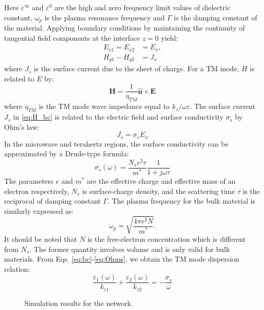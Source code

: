 \documentclass[conference, 10pt]{IEEEtran}
\renewcommand{\v}[1]{\mathbf{#1}} %
\renewcommand{\O}{\omega}  %
\newcommand{\E}{\varepsilon}  %
\renewcommand{\inf}{\infty}  %
\renewcommand{\^}{\hat}  %
\begin{document}
%
Here $\E^{\inf}$ and $\E^0$ are the high and zero frequency limit values of dielectric constant, $\O_p$ is the plasma resonance frequency and $\Gamma$ is the damping constant of the material. Applying boundary conditions by maintaining the continuity of tangential field components at the interface $z = 0$ yield:
%
\begin{subequations}
  \begin{align}
    E_{x1} =  E_{x2} &= E_x,
    \label{eq:E_bc}\\
    H_{y1} - H_{y2} &= J_s
    \label{eq:H_bc}
  \end{align}
  \label{eq:bc}
\end{subequations}
%
where $J_s$ is the surface current due to the sheet of charge. For a TM mode, $H$ is related to $E$ by:
%
\begin{equation}
  \v H = \frac{1}{\eta_{TM}} \v{\^{n}} \times \v E
  \label{eq:H_TM}
\end{equation}
%
where $\eta_{TM}$ is the TM mode wave impedance equal to $k_{z}/{\O \E}$. The surface current $J_s$ in \eqref{eq:H_bc} is related to the electric field and surface conductivity $\sigma_s$ by Ohm's law:
%
\begin{equation}
  J_s = \sigma_s E_x
  \label{eq:Ohms}
\end{equation}
%
In the microwave and terahertz regions, the surface conductivity can be approximated by a Drude-type formula:
%
\begin{equation}
  \sigma_s(\O) = \frac{N_s e^2 \tau}{m^{\ast}}\frac{1}{1 + j \O \tau}
  \label{eq:conductivity}
\end{equation}
%
The parameters $e$ and $m^*$ are the effective charge and effective mass of an electron respectively, $N_s$ is  surface-charge density, and the scattering time $\tau$ is the reciprocal of damping constant $\Gamma$. The plasma frequency for the bulk material is similarly expressed as:
%
\begin{equation}
  \O_{p} =  \sqrt{\frac{4 \pi e^2 N} {m^{\ast}}}.
  \label{eq:plasma_f}
\end{equation}
%
It should be noted that $N$ is the free-electron concentration which is different from $N_s$. The former quantity involves volume and is only valid for bulk materials. From Eqs. \eqref{eq:bc}-\eqref{eq:Ohms}, we obtain the TM mode dispersion relation:
%
\begin{equation}
  \frac{\E_1(\O)}{k_{z1}} + \frac{\E_2(\O)}{k_{z2}} = -\frac{\sigma_s}{\O}
  \label{eq:disp_bas}
\end{equation}
%
%
%
%
\begin{figure*}[!t]
\centering
\subfloat[Case I]{
\label{fig_first_case}}
\hfil
\subfloat[Case II]{
\label{fig_second_case}}
\caption{Simulation results for the network.}
\label{fig_sim}
\end{figure*}
\end{document}
